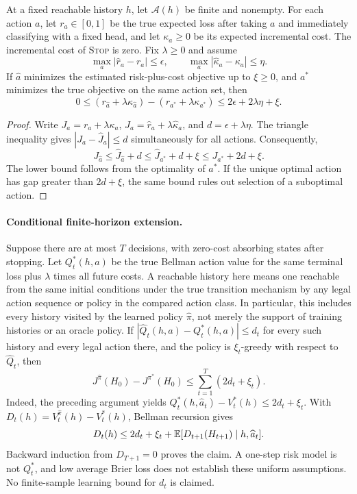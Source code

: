 \begin{acamprop}
\label{prop:acam-regret}
At a fixed reachable history $h$, let $\mathcal A(h)$ be finite and
nonempty. For each action $a$, let $r_a\in[0,1]$ be the true expected loss
after taking $a$ and immediately classifying with a fixed head, and let
$\kappa_a\geq0$ be its expected incremental cost. The incremental cost of
\textnormal{\textsc{Stop}} is zero. Fix $\lambda\geq0$ and assume
\[
 \max_a|\widehat r_a-r_a|\leq\epsilon,\qquad
 \max_a|\widehat\kappa_a-\kappa_a|\leq\eta.
\]
If $\widehat a$ minimizes the estimated risk-plus-cost objective up to
$\xi\geq0$, and $a^*$ minimizes the true objective on the same action
set, then
\[
 0\leq
 (r_{\widehat a}+\lambda\kappa_{\widehat a})
 -(r_{a^*}+\lambda\kappa_{a^*})
 \leq2\epsilon+2\lambda\eta+\xi.
\]
\end{acamprop}

\begin{proof}
Write $J_a=r_a+\lambda\kappa_a$,
$\widehat J_a=\widehat r_a+\lambda\widehat\kappa_a$, and
$d=\epsilon+\lambda\eta$. The triangle inequality gives
$|J_a-\widehat J_a|\leq d$ simultaneously for all actions. Consequently,
\[
 J_{\widehat a}\leq\widehat J_{\widehat a}+d
 \leq\widehat J_{a^*}+d+\xi
 \leq J_{a^*}+2d+\xi.
\]
The lower bound follows from the optimality of $a^*$. If the unique
optimal action has gap greater than $2d+\xi$, the same bound rules out
selection of a suboptimal action.
\end{proof}

\paragraph{Conditional finite-horizon extension.}
Suppose there are at most $T$ decisions, with zero-cost absorbing states
after stopping. Let $Q_t^*(h,a)$ be the true Bellman action value for the
same terminal loss plus $\lambda$ times all future costs. A reachable
history here means one reachable from the same initial conditions under
the true transition mechanism by any legal action sequence or policy
in the compared action class. In particular, this includes every
history visited by the learned policy $\widehat\pi$, not merely the
support of training histories or an oracle policy. If
$|\widehat Q_t(h,a)-Q_t^*(h,a)|\leq d_t$ for every such history and every
legal action there, and the policy is $\xi_t$-greedy with respect to
$\widehat Q_t$, then
\[
 J^{\widehat\pi}(H_0)-J^{\pi^*}(H_0)
 \leq\sum_{t=1}^T(2d_t+\xi_t).
\]
Indeed, the preceding argument yields
$Q_t^*(h,\widehat a_t)-V_t^*(h)\leq2d_t+\xi_t$. With
$D_t(h)=V_t^{\widehat\pi}(h)-V_t^*(h)$, Bellman recursion gives
\[
 D_t(h)\leq2d_t+\xi_t+
 \mathbb{E}[D_{t+1}(H_{t+1})\mid h,\widehat a_t].
\]
Backward induction from $D_{T+1}=0$ proves the claim. A one-step risk
model is not $Q_t^*$, and low average Brier loss does not establish these
uniform assumptions. No finite-sample learning bound for $d_t$ is claimed.

